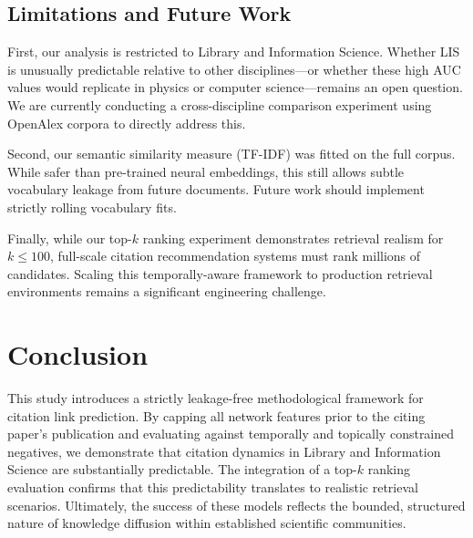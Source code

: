 \documentclass[11pt,a4paper]{article}
\begin{document}
\subsection{Limitations and Future Work}
First, our analysis is restricted to Library and Information Science. Whether LIS is unusually predictable relative to other disciplines---or whether these high AUC values would replicate in physics or computer science---remains an open question. We are currently conducting a cross-discipline comparison experiment using OpenAlex corpora to directly address this.

Second, our semantic similarity measure (TF-IDF) was fitted on the full corpus. While safer than pre-trained neural embeddings, this still allows subtle vocabulary leakage from future documents. Future work should implement strictly rolling vocabulary fits. 

Finally, while our top-$k$ ranking experiment demonstrates retrieval realism for $k \le 100$, full-scale citation recommendation systems must rank millions of candidates. Scaling this temporally-aware framework to production retrieval environments remains a significant engineering challenge.

\section{Conclusion}
\label{sec:conclusion}
This study introduces a strictly leakage-free methodological framework for citation link prediction. By capping all network features prior to the citing paper's publication and evaluating against temporally and topically constrained negatives, we demonstrate that citation dynamics in Library and Information Science are substantially predictable. The integration of a top-$k$ ranking evaluation confirms that this predictability translates to realistic retrieval scenarios. Ultimately, the success of these models reflects the bounded, structured nature of knowledge diffusion within established scientific communities.



\end{document}
